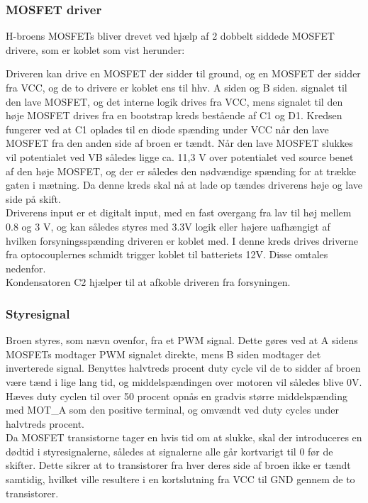 \subsubsection*{MOSFET driver}
\label{Vuggesytem:HW_DESIGN_MOSDRIVER} 
H-broens MOSFETs bliver drevet ved hjælp af 2 dobbelt siddede MOSFET drivere, som er koblet som vist herunder:


Driveren kan drive en MOSFET der sidder til ground, og en MOSFET der sidder fra VCC, og de to drivere er koblet ens til hhv. A siden og B siden. signalet til den lave MOSFET, og det interne logik drives fra VCC, mens signalet til den høje MOSFET drives fra en bootstrap kreds bestående af C1 og D1. Kredsen fungerer ved at C1 oplades til en diode spænding under VCC når den lave MOSFET fra den anden side af broen er tændt. Når den lave MOSFET slukkes vil potentialet ved VB således ligge ca. 11,3 V over potentialet ved source benet af den høje MOSFET, og der er således den nødvændige spænding for at trække gaten i mætning. Da denne kreds skal nå at lade op tændes driverens høje og lave side på skift.\\
Driverens input er et digitalt input, med en fast overgang fra lav til høj mellem 0.8 og 3 V, og kan således styres med 3.3V logik eller højere uafhængigt af hvilken forsyningsspænding driveren er koblet med. I denne kreds drives driverne fra optocouplernes schmidt trigger koblet til batteriets 12V. Disse omtales nedenfor.\\
Kondensatoren C2 hjælper til at afkoble driveren fra forsyningen. \\

\subsubsection*{Styresignal}
\label{Vuggesystem:Styresignal} 
Broen styres, som nævn ovenfor, fra et PWM signal. Dette gøres ved at A sidens MOSFETs modtager PWM signalet direkte, mens B siden modtager det inverterede signal. Benyttes halvtreds procent duty cycle vil de to sidder af broen være tænd i lige lang tid, og middelspændingen over motoren vil således blive 0V. Hæves duty cyclen til over 50 procent opnås en gradvis større middelspænding med MOT\_A som den positive terminal, og omvændt ved duty cycles under halvtreds procent. \\

Da MOSFET transistorne tager en hvis tid om at slukke, skal der introduceres en dødtid i styresignalerne, således at signalerne alle går kortvarigt til 0 før de skifter. Dette sikrer at to transistorer fra hver deres side af broen ikke er tændt samtidig, hvilket ville resultere i en kortslutning fra VCC til GND gennem de to transistorer. \\

